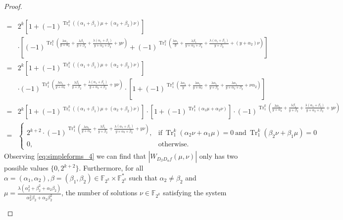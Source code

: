 \documentclass{article}
\newcommand{\F}{\mathbb{F}}
\newcommand{\0}{\textbf{0}}
\newcommand{\1}{\textbf{1}}
\newcommand{\TRACE}{\operatorname{Tr}_1^k}
\theoremstyle{plain}
\begin{document}
\begin{proof}
\begin{enumerate}[label=\textbf{Case \arabic*},wide = 0pt]
\begin{enumerate}[label=\textbf{Subcase \Alph{*}},itemindent=*,wide=\parindent]
\begin{align}
                    =&2^k\left[1+(-1)^{\TRACE\left((\alpha_1+\beta_1)\mu+ (\alpha_2+\beta_2)\nu\right)}\right]\nonumber\\
                    &\cdot
                    \left[(-1)^{\TRACE\left(\frac{\lambda\alpha_1}{y+\alpha_2}+\frac{\lambda\beta_1}{y+\beta_2}+\frac{\lambda(\alpha_1+\beta_1)}{y+\alpha_2+\beta_2}+ y\nu\right)}+
                    (-1)^{\TRACE\left(\frac{\lambda\alpha_1}{y}+\frac{\lambda\beta_1}{y+\alpha_2+\beta_2}+\frac{\lambda(\alpha_1+\beta_1)}{y+\beta_2}+ (y+\alpha_2)\nu\right)}\right]\nonumber\\
                    =&2^k\left[1+(-1)^{\TRACE\left((\alpha_1+\beta_1)\mu+ (\alpha_2+\beta_2)\nu\right)}\right]\nonumber\\
                    &\cdot
                    (-1)^{\TRACE\left(\frac{\lambda\alpha_1}{y+\alpha_2}+\frac{\lambda\beta_1}{y+\beta_2}+\frac{\lambda(\alpha_1+\beta_1)}{y+\alpha_2+\beta_2}+ y\nu\right)}\cdot
                    \left[1+(-1)^{\TRACE\left(\frac{\lambda\alpha_1}{y}+\frac{\lambda\alpha_1}{y+\alpha_2}+\frac{\lambda\alpha_1}{y+\beta_2}+\frac{\lambda\alpha_1}{y+\alpha_2+\beta_2}+\nu\alpha_2\right)}\right]\nonumber\\
                    =&2^k\left[1+(-1)^{\TRACE\left((\alpha_1+\beta_1)\mu+ (\alpha_2+\beta_2)\nu\right)}\right]\cdot
                    \left[1+(-1)^{\TRACE\left(\alpha_1\mu+\alpha_2\nu\right)}\right]\cdot
                    (-1)^{\TRACE\left(\frac{\lambda\alpha_1}{y+\alpha_2}+\frac{\lambda\beta_1}{y+\beta_2}+\frac{\lambda(\alpha_1+\beta_1)}{y+\alpha_2+\beta_2}+ y\nu\right)}\nonumber\\
                    =&\begin{cases}
                        2^{k+2}\cdot(-1)^{\TRACE\left(\frac{\lambda\alpha_1}{y+\alpha_2}+\frac{\lambda\beta_1}{y+\beta_2}+\frac{\lambda(\alpha_1+\beta_1)}{y+\alpha_2+\beta_2}+ y\nu\right)},&\text{if}~\TRACE\left(\alpha_2\nu+\alpha_1\mu\right)=0 ~
                        \text{and}~\TRACE\left(\beta_2\nu+\beta_1 \mu\right)=0 \\
                        0,~&\text{otherwise}.
                    \end{cases}
                \end{align}
                Observing \eqref{eq:simpleforms_4} we can find that $|W_{D_{\beta}D_{\alpha}f}(\mu,\nu)|$ only has two possible values $\{0,2^{k+2}\}$. 
                Furthermore, for all $\alpha=(\alpha_1,\alpha_2),\beta=(\beta_1,\beta_2)\in\F_{2^k}\times\F_{2^k}^*$ such that $\alpha_2\ne\beta_2$ and $\mu=\frac{\lambda(\alpha_2^2+\beta_2^2+\alpha_2\beta_2)}{\alpha_2^2\beta_2+\alpha_2\beta_2^2}$, the number of solutions $\nu\in\F_{2^k}$ satisfying the system

\end{enumerate}
\end{enumerate}
\end{proof}
\end{document}
